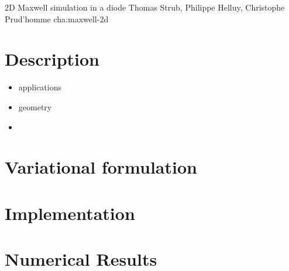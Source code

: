             {2D Maxwell simulation in a diode}
            {Thomas Strub, Philippe Helluy, Christophe Prud'homme}
            {cha:maxwell-2d}

\section{Description}
\label{sec:description}

\begin{itemize}
\item applications
\item geometry
\item
\end{itemize}

\section{Variational formulation}
\label{sec:vari-form}

\section{Implementation}
\label{sec:implementation}

\section{Numerical Results}
\label{sec:numerical-results}


